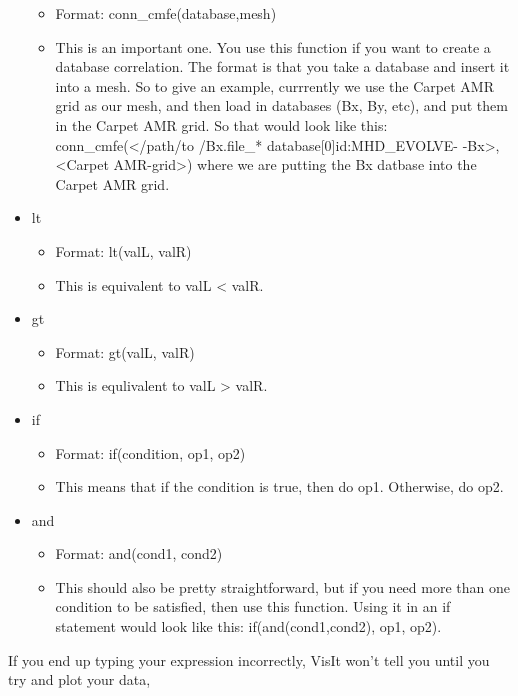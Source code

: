 \documentclass[english]{article}
\begin{document}
\begin{itemize}
\begin{itemize}
            \item Format: conn\_cmfe(database,mesh)
            \item This is an important one. You use this function if you want to create a database correlation.
                  The format is that you take a database and insert it into a mesh. So to give an example, 
                  currrently we use the Carpet AMR grid as our mesh, and then load in databases (Bx, By, etc),
                  and put them in the Carpet AMR grid. So that would look like this: conn\_cmfe(</path/to
                  /Bx.file\_* database[0]id:MHD\_EVOLVE- -Bx>, <Carpet AMR-grid>)
                  where we are putting the Bx datbase into the Carpet AMR grid.
        \end{itemize}
        \item lt
        \begin{itemize}
            \item Format: lt(valL, valR)
            \item This is equivalent to valL < valR.
        \end{itemize}
        \item gt
        \begin{itemize}
            \item Format: gt(valL, valR)
            \item This is equlivalent to valL > valR. 
        \end{itemize}
        \item if
        \begin{itemize}
            \item Format: if(condition, op1, op2)
            \item This means that if the condition is true, then do op1. Otherwise, do op2.
        \end{itemize}
        \item and
        \begin{itemize}
            \item Format: and(cond1, cond2)
            \item This should also be pretty straightforward, but if you need more than one condition to be
                  satisfied, then use this function. Using it in an if statement would look like this: 
                  if(and(cond1,cond2), op1, op2).
        \end{itemize}
    \end{itemize}
    If you end up typing your expression incorrectly, VisIt won't tell you until you try and plot your data,
\end{document}
